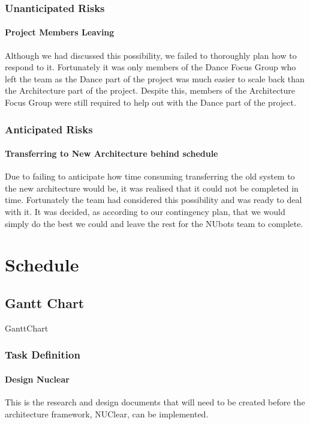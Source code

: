 \documentclass[a4paper]{article}
\begin{document}
			\subsubsection{Unanticipated Risks}
				\paragraph{Project Members Leaving}  
					Although we had discussed this possibility, we failed to thoroughly plan how to respond to it. Fortunately it was only members of the Dance Focus Group who left the team as the Dance part of the project was much easier to scale back than the Architecture part of the project. Despite this, members of the Architecture Focus Group were still required to help out with the Dance part of the project.
			\subsubsection{Anticipated Risks}
				\paragraph{Transferring to New Architecture behind schedule}  
					Due to failing to anticipate how time consuming transferring the old system to the new architecture would be, it was realised that it could not be completed in time. Fortunately the team had considered this possibility and was ready to deal with it. It was decided, as according to our contingency plan, that we would simply do the best we could and leave the rest for the NUbots team to complete.

	\section{Schedule}
		\subsection{Gantt Chart}
			{GanttChart}
			\subsubsection{Task Definition}
				\paragraph{Design Nuclear}
					This is the research and design documents that will need to be created before the architecture framework, NUClear, can be implemented.
\end{document}
